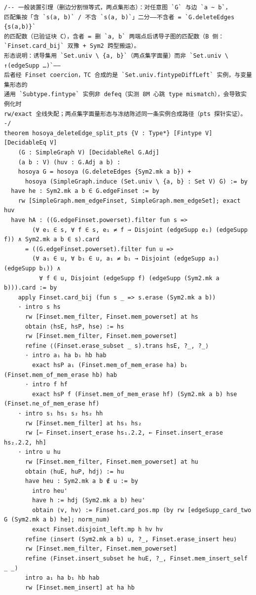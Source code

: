 \documentclass[11pt]{article}
\theoremstyle{definition}
\begin{document}
\begin{lstlisting}
/-- 一般装置引理（删边分割恒等式，两点集形态）：对任意图 `G` 与边 `a ~ b`，
匹配集按「含 `s(a, b)` / 不含 `s(a, b)`」二分——不含者 = `G.deleteEdges {s(a,b)}`
的匹配数（已验证块 C），含者 = 删 `a, b` 两端点后诱导子图的匹配数（B 侧：
`Finset.card_bij` 双豫 + Sym2 跨型搬运）。
形态说明：诱导集用 `Set.univ \ {a, b}`（两点集字面量）而非 `Set.univ \ ↑(edgeSupp …)`——
后者经 Finset coercion，TC 合成的是 `Set.univ.fintypeDiffLeft` 实例，与变量集形态的
通用 `Subtype.fintype` 实例非 defeq（实测 8M 心跳 type mismatch），会导致实例化时
rw/exact 全线失配；两点集字面量形态与冻结陈述同一条实例合成路径（pts 探针实证）。 -/
theorem hosoya_deleteEdge_split_pts {V : Type*} [Fintype V] [DecidableEq V]
    (G : SimpleGraph V) [DecidableRel G.Adj]
    (a b : V) (huv : G.Adj a b) :
    hosoya G = hosoya (G.deleteEdges {Sym2.mk a b}) +
      hosoya (SimpleGraph.induce (Set.univ \ {a, b} : Set V) G) := by
  have he : Sym2.mk a b ∈ G.edgeFinset := by
    rw [SimpleGraph.mem_edgeFinset, SimpleGraph.mem_edgeSet]; exact huv
  have hA : ((G.edgeFinset.powerset).filter fun s =>
        (∀ e₁ ∈ s, ∀ f ∈ s, e₁ ≠ f → Disjoint (edgeSupp e₁) (edgeSupp f)) ∧ Sym2.mk a b ∈ s).card
      = ((G.edgeFinset.powerset).filter fun u =>
        (∀ a₁ ∈ u, ∀ b₁ ∈ u, a₁ ≠ b₁ → Disjoint (edgeSupp a₁) (edgeSupp b₁)) ∧
          ∀ f ∈ u, Disjoint (edgeSupp f) (edgeSupp (Sym2.mk a b))).card := by
    apply Finset.card_bij (fun s _ => s.erase (Sym2.mk a b))
    · intro s hs
      rw [Finset.mem_filter, Finset.mem_powerset] at hs
      obtain ⟨hsE, hsP, hse⟩ := hs
      rw [Finset.mem_filter, Finset.mem_powerset]
      refine ⟨(Finset.erase_subset _ s).trans hsE, ?_, ?_⟩
      · intro a₁ ha b₁ hb hab
        exact hsP a₁ (Finset.mem_of_mem_erase ha) b₁ (Finset.mem_of_mem_erase hb) hab
      · intro f hf
        exact hsP f (Finset.mem_of_mem_erase hf) (Sym2.mk a b) hse (Finset.ne_of_mem_erase hf)
    · intro s₁ hs₁ s₂ hs₂ hh
      rw [Finset.mem_filter] at hs₁ hs₂
      rw [← Finset.insert_erase hs₁.2.2, ← Finset.insert_erase hs₂.2.2, hh]
    · intro u hu
      rw [Finset.mem_filter, Finset.mem_powerset] at hu
      obtain ⟨huE, huP, hdj⟩ := hu
      have heu : Sym2.mk a b ∉ u := by
        intro heu'
        have h := hdj (Sym2.mk a b) heu'
        obtain ⟨v, hv⟩ := Finset.card_pos.mp (by rw [edgeSupp_card_two G (Sym2.mk a b) he]; norm_num)
        exact Finset.disjoint_left.mp h hv hv
      refine ⟨insert (Sym2.mk a b) u, ?_, Finset.erase_insert heu⟩
      rw [Finset.mem_filter, Finset.mem_powerset]
      refine ⟨Finset.insert_subset he huE, ?_, Finset.mem_insert_self _ _⟩
      intro a₁ ha b₁ hb hab
      rw [Finset.mem_insert] at ha hb

\end{lstlisting}
\end{document}

